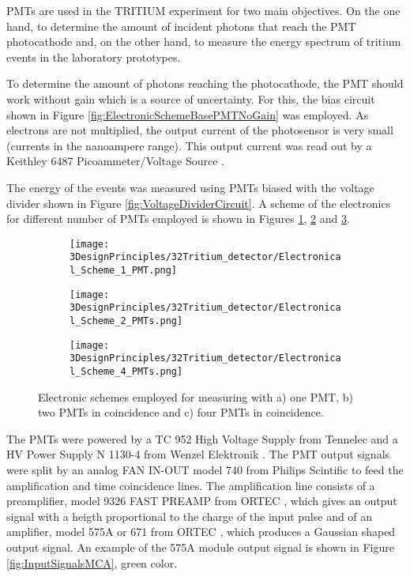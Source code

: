 PMTs are used in the TRITIUM experiment for two main objectives. On the one hand, to determine the amount of incident photons that reach the PMT photocathode and, on the other hand, to measure the energy spectrum of tritium events in the laboratory prototypes.

To determine the amount of photons reaching the photocathode, the PMT should work without gain which is a source of uncertainty. For this, the bias circuit shown in Figure \ref{fig:ElectronicSchemeBasePMTNoGain} was employed. As electrons are not multiplied, the output current of the photosensor is very small (currents in the nanoampere range). This output current was read out by a Keithley 6487 Picoammeter/Voltage Source \cite{DataSheetKeithley6487}. 

The energy of the events was measured using PMTs biased with the voltage divider shown in Figure \ref{fig:VoltageDividerCircuit}. A scheme of the electronics for different number of PMTs employed is shown in Figures \ref{subfig:ElectronicConfiguraiton1PMT}, \ref{subfig:ElectronicConfiguraiton2PMT} and \ref{subfig:ElectronicConfiguraiton4PMT}.

\begin{figure}
\centering
    \begin{subfigure}[b]{1.0\textwidth}
    \centering
    \texttt{[image: 3DesignPrinciples/32Tritium\_detector/Electronical\_Scheme\_1\_PMT.png]}  
    \caption{\label{subfig:ElectronicConfiguraiton1PMT}}
    \end{subfigure}
    \hfill
    \begin{subfigure}[b]{1.0\textwidth}
    \centering
    \texttt{[image: 3DesignPrinciples/32Tritium\_detector/Electronical\_Scheme\_2\_PMTs.png]}  
    \caption{\label{subfig:ElectronicConfiguraiton2PMT}}
    \end{subfigure}
    \hfill
    \begin{subfigure}[b]{1.0\textwidth}
    \centering
    \texttt{[image: 3DesignPrinciples/32Tritium\_detector/Electronical\_Scheme\_4\_PMTs.png]}  
    \caption{\label{subfig:ElectronicConfiguraiton4PMT}}
    \end{subfigure}
 \caption{Electronic schemes employed for measuring with a) one PMT, b) two PMTs in coincidence and c) four PMTs in coincidence.}
 \label{fig:ElectronicConfiguraitonsPMT}
\end{figure}

The PMTs were powered by a TC 952 High Voltage Supply from Tennelec \cite{DataSheetHVSupplyTennelec} and a HV Power Supply N 1130-4 from Wenzel Elektronik \cite{DataSheetHVSupplyWenzel}. The PMT output signals were split by an analog FAN IN-OUT model 740 from Philips Scintific \cite{DataSheetFANINOUT} to feed the amplification and time coincidence lines. The amplification line consists of a preamplifier, model 9326 FAST PREAMP from ORTEC \cite{DataSheetPreAmp}, which gives an output signal with a heigth proportional to the charge of the input pulse and of an amplifier, model 575A or 671 from ORTEC \cite{DataSheet575Amp, DataSheet671Amp}, which produces a Gaussian shaped output signal. An example of the 575A module output signal is shown in Figure \ref{fig:InputSignalsMCA}, green color. 

